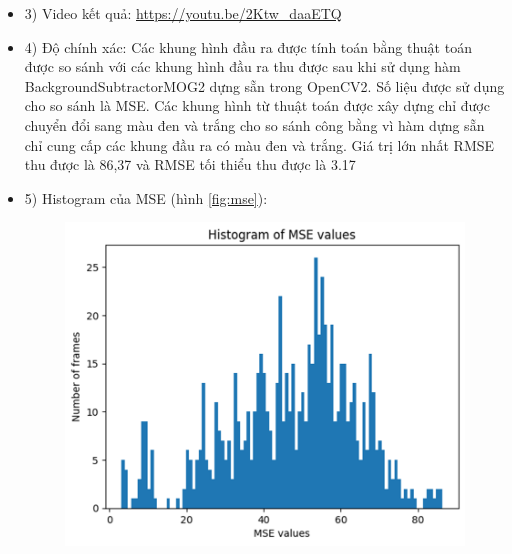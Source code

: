 \documentclass[a4paper]{article}
\begin{document}
\begin{itemize}[label={}]
\begin{table}
    \end{table}
    \\ \\ \\ \\ \\ \\ \\ \\ \\ \\ \\ \\ \\ \\ \\ \\ 
    \item 3) Video kết quả: \url{https://youtu.be/2Ktw_daaETQ}
    \item 4)  Độ chính xác: Các khung hình đầu ra được tính toán bằng thuật toán được so sánh với các khung hình đầu ra thu được sau khi sử dụng hàm BackgroundSubtractorMOG2 dựng sẵn trong OpenCV2. Số liệu được sử dụng cho so sánh là MSE\cite{mean_squared_error}. Các khung hình từ thuật toán được xây dựng chỉ được chuyển đổi sang màu đen và trắng cho so sánh công bằng vì hàm dựng sẵn chỉ cung cấp các khung đầu ra có màu đen và trắng. Giá trị lớn nhất RMSE thu được là 86,37 và RMSE tối thiểu thu được là 3.17 
    \item 5) Histogram của MSE (hình \ref{fig:mse}):
    \begin{figure}
        \centering
        \includegraphics[width=1\linewidth]{images//result/mse.png}

\end{figure}
\end{itemize}
\end{document}
